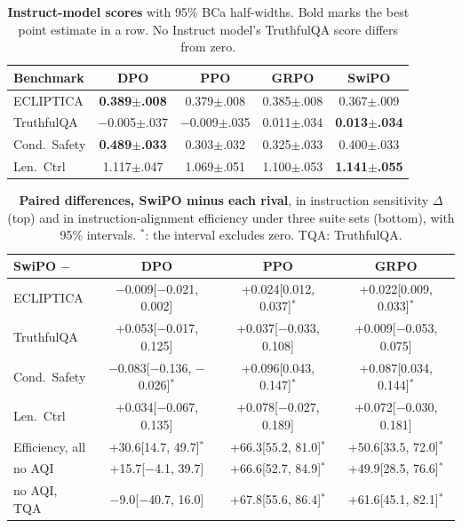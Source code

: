 \begin{table}[ht!]
\centering
\scriptsize
\setlength{\tabcolsep}{2pt}
\begin{tabular}{@{}lcccc@{}}
\toprule
\textbf{Benchmark} & \textbf{DPO} & \textbf{PPO} & \textbf{GRPO} & \textbf{SwiPO} \\
\midrule
ECLIPTICA & \textbf{0.389{\tiny$\pm$.008}} & 0.379{\tiny$\pm$.008} & 0.385{\tiny$\pm$.008} & 0.367{\tiny$\pm$.009} \\
TruthfulQA & $-$0.005{\tiny$\pm$.037} & $-$0.009{\tiny$\pm$.035} & 0.011{\tiny$\pm$.034} & \textbf{0.013{\tiny$\pm$.034}} \\
Cond.\ Safety & \textbf{0.489{\tiny$\pm$.033}} & 0.303{\tiny$\pm$.032} & 0.325{\tiny$\pm$.033} & 0.400{\tiny$\pm$.033} \\
Len.\ Ctrl & 1.117{\tiny$\pm$.047} & 1.069{\tiny$\pm$.051} & 1.100{\tiny$\pm$.053} & \textbf{1.141{\tiny$\pm$.055}} \\
\bottomrule
\end{tabular}
\caption{\textbf{Instruct-model scores} with 95\% BCa half-widths. Bold marks the best point estimate in a row. No Instruct model's TruthfulQA score differs from zero.}
\label{tab:ci_scores}
\end{table}

\begin{table}[ht!]
\centering
\footnotesize
\setlength{\tabcolsep}{6pt}
\begin{tabular}{@{}lccc@{}}
\toprule
\textbf{SwiPO $-$} & \textbf{DPO} & \textbf{PPO} & \textbf{GRPO} \\
\midrule
ECLIPTICA & $-$0.009{\tiny[$-$0.021, 0.002]} & +0.024{\tiny[0.012, 0.037]}$^{*}$ & +0.022{\tiny[0.009, 0.033]}$^{*}$ \\
TruthfulQA & +0.053{\tiny[$-$0.017, 0.125]} & +0.037{\tiny[$-$0.033, 0.108]} & +0.009{\tiny[$-$0.053, 0.075]} \\
Cond.\ Safety & $-$0.083{\tiny[$-$0.136, $-$0.026]}$^{*}$ & +0.096{\tiny[0.043, 0.147]}$^{*}$ & +0.087{\tiny[0.034, 0.144]}$^{*}$ \\
Len.\ Ctrl & +0.034{\tiny[$-$0.067, 0.135]} & +0.078{\tiny[$-$0.027, 0.189]} & +0.072{\tiny[$-$0.030, 0.181]} \\
\midrule
Efficiency, all & +30.6{\tiny[14.7, 49.7]}$^{*}$ & +66.3{\tiny[55.2, 81.0]}$^{*}$ & +50.6{\tiny[33.5, 72.0]}$^{*}$ \\
\quad no AQI & +15.7{\tiny[$-$4.1, 39.7]} & +66.6{\tiny[52.7, 84.9]}$^{*}$ & +49.9{\tiny[28.5, 76.6]}$^{*}$ \\
\quad no AQI, TQA & $-$9.0{\tiny[$-$40.7, 16.0]} & +67.8{\tiny[55.6, 86.4]}$^{*}$ & +61.6{\tiny[45.1, 82.1]}$^{*}$ \\
\bottomrule
\end{tabular}
\caption{\textbf{Paired differences, SwiPO minus each rival}, in instruction sensitivity $\Delta$ (top) and in instruction-alignment efficiency under three suite sets (bottom), with 95\% intervals. $^{*}$: the interval excludes zero. TQA: TruthfulQA.}
\label{tab:ci_paired}
\end{table}

